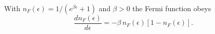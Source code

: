 \documentclass{article}
\begin{document}
With $n_F(\epsilon) = 1/(e^{\beta\epsilon}+1)$ and $\beta>0$ the Fermi function obeys
\begin{equation}
\frac{d n_F(\epsilon)}{d\epsilon} = -\beta\, n_F(\epsilon)\left[1-n_F(\epsilon)\right] .
\label{eq:dnf}
\end{equation}
\end{document}
